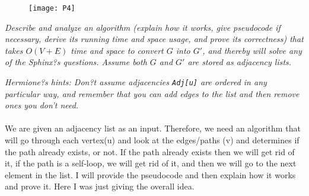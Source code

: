 \documentclass[12pt]{article} \setlength{\oddsidemargin}{0in}
\begin{document}
\begin{figure}[h]
  \centering \texttt{[image: P4]}
\end{figure}

\textit{Describe and analyze an algorithm (explain how it works, give
  pseudocode if necessary, derive its running time and space usage,
  and prove its correctness) that takes $O(V + E)$ time and space to
  convert $G$ into $G'$, and thereby will solve any of the Sphinx?s
  questions. Assume both $G$ and $G'$ are stored as adjacency lists.}

\textit{Hermione?s hints: Don?t assume adjacencies \texttt{Adj[u]} are
  ordered in any particular way, and remember that you can add edges
  to the list and then remove ones you don't need.}
\\\\
We are given an adjacency list as an input. Therefore, we need an algorithm that will go through each vertex(u)  and look at the edges/paths (v) and determines if the path already exists, or not. If the path already exists then we will get rid of it, if the path is a self-loop, we will get rid of it, and then we will go to the next element in the list. I will provide the pseudocode and then explain how it works and prove it. Here I was just giving the overall idea. 
\end{document}
